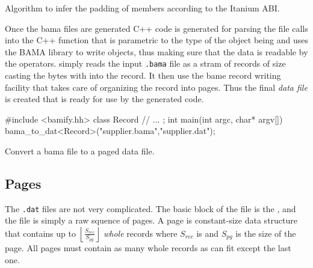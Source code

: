 \begin{code}
  \caption{\label{lst:record_byte_padding}Algorithm to infer the
    padding of members according to the Itanium ABI.}
\end{code}


Once the bama files are generated C++ code is generated for parsing
the file calls into the C++ function  that is parametric
to the type of the object being and uses the BAMA library to write
objects, thus making sure that the data is readable by the
operators.  simply reads the input \texttt{.bama} file as a
stram of records of size  casting the bytes with
 into the record. It then use the bame
record writing facility  that takes care of
organizing the record into pages. Thus the final \emph{data file} is
created that is ready for use by the generated code.

\begin{code}
\begin{cppcode}
#include <bamify.hh>
class Record {
  // ...
};
int main(int argc, char* argv[]) {
  bama_to_dat<Record>("supplier.bama","supplier.dat");
}
\end{cppcode}
  \caption{Convert a bama file to a paged data file.}
\end{code}

\subsection{Pages}

The \texttt{.dat} files are not very complicated. The basic block of the file
is the , and the file is simply a raw squence of pages. A page
is constant-size data structure that contains up to
\(\left\lfloor\frac{S_{rec}}{S_{pg}} \right\rfloor\) \emph{whole} records
where \(S_{rec}\) is  and \(S_{pg}\) is the size of
the page. All pages must contain as many whole records as can fit
except the last one.

